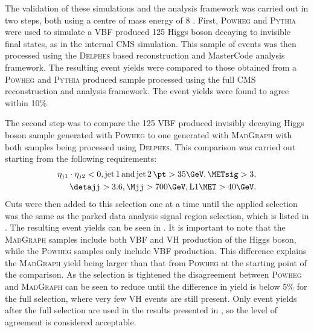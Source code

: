 The validation of these simulations and the analysis framework was carried out in two steps, both using a centre of mass energy of 8 \TeV. First, \textsc{Powheg} and \textsc{Pythia} were used to simulate a \ac{VBF} produced 125 \GeV Higgs boson decaying to invisible final states, as in the internal CMS simulation. This sample of events was then processed using the \textsc{Delphes} based reconstruction and MasterCode analysis framework. The resulting event yields were compared to those obtained from a \textsc{Powheg} and \textsc{Pythia} produced sample processed using the full CMS reconstruction and analysis framework. The event yields were found to agree within 10\%.


The second step was to compare the 125 \GeV \ac{VBF} produced invisibly decaying Higgs boson sample generated with \textsc{Powheg} to one generated with \textsc{MadGraph} with both samples being processed using \textsc{Delphes}. This comparison was carried out starting from the following requirements:
\begin{align}
  \label{eq:dmvalstart}
  \begin{split}
\eta_{j1}\cdot\eta_{j2}<0, \rm{jet\,1\,and\,jet\,2\,}\pt>35 \GeV, \METsig>3,\\ \detajj>3.6, \Mjj>700 \GeV, \rm{L1} \MET>40 \GeV.
  \end{split}
\end{align}
Cuts were then added to this selection one at a time until the applied selection was the same as the parked data analysis signal region selection, which is listed in . The resulting event yields can be seen in . It is important to note that the \textsc{MadGraph} samples include both \ac{VBF} and \ac{VH} production of the Higgs boson, while the \textsc{Powheg} samples only include \ac{VBF} production. This difference explains the \textsc{MadGraph} yield being larger than that from \textsc{Powheg} at the starting point of the comparison. As the selection is tightened the disagreement between \textsc{Powheg} and \textsc{MadGraph} can be seen to reduce until the difference in yield is below 5\% for the full selection, where very few \ac{VH} events are still present. Only event yields after the full selection are used in the results presented in , so the level of agreement is considered acceptable.

